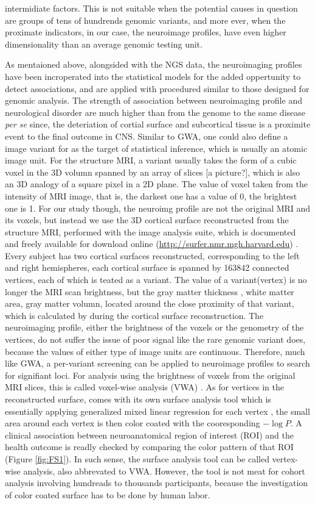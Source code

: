 intermidiate factors. This is not suitable when the potential causes in question are groups of tens of hundrends genomic variants, and more ever, when the proximate indicators, in our case, the neuroimage profiles, have even higher dimensionality than an average genomic testing unit.

As mentaioned above, alongsided with the NGS data, the neuroimaging profiles have been incroperated into the statistical models for the added oppertunity to detect associations, and are applied with procedured similar to those designed for genomic analysis. The strength of association between neuroimaging profile and neurological disorder are much higher than from the genome to the same disease \textit{per se} since, the deteriation of cortial surface and subcortical tissue is a proximite event to the final outcome in CNS. Similar to GWA, one could also define a image variant for as the target of statistical inference, which is usually an atomic image unit. For the structure MRI, a variant usually takes the form of a cubic voxel in the 3D volumn spanned by an array of slices [a picture?], which is also an 3D analogy of a square pixel in a 2D plane. The value of voxel taken from the intensity of MRI image, that is, the darkest one has a value of 0, the brightest one is 1. For our study though, the neuroimg profile are not the original MRI and its voxels, but instead we use the 3D cortical surface reconstructed from the structure MRI, performed with the \FS image analysis suite, which is documented and freely available for download online (\url{http://surfer.nmr.mgh.harvard.edu}) \cite{FS:Intro}. Every subject has two cortical surfaces reconstructed, corresponding to the left and right hemispheres, each cortical surface is spanned by 163842 connected vertices, each of which is teated as a variant. The value of a variant(vertex) is no longer the MRI scan brightness, but the gray matter thickness \cite{FS:Tck1, FS:Tck2}, white matter area, gray matter volumn, located around the close proximity of that variant, which is calculated by \FS during the cortical surface reconstruction. The neuroimaging profile, either the brightness of the voxels or the genometry of the vertices, do not suffer the issue of poor signal like the rare genomic variant does, because the values of either type of image units are continuous. Therefore, much like GWA, a per-variant screening can be applied to neuroimage profiles to search for signifiant loci. For analysis using the brightness of voxels from the original MRI slices, this is called voxel-wise analysis (VWA) \cite{VWA1, VWA2, VWA3, VWA4}. As for vertices in the reconstructed surface, \FS comes with its own surface analysis tool which is essentially applying generalized mixed linear regression for each vertex \cite{FS:Anl1, FS:Anl2}, the small area around each vertex is then color coated with the cooresponding $-\log{P}$. A clinical association between neuroanatomical region of interest (ROI) and the health outcome is readly checked by comparing the color pattern of that ROI (Figure \ref{fig:FS1}). In such sense, the \FS surface analysis tool can be called vertex-wise analysis, also abbrevated to VWA. However, the \FS tool is not meat for cohort analysis involving hundreads to thousands participants, because the investigation of color coated surface has to be done by human labor. 
